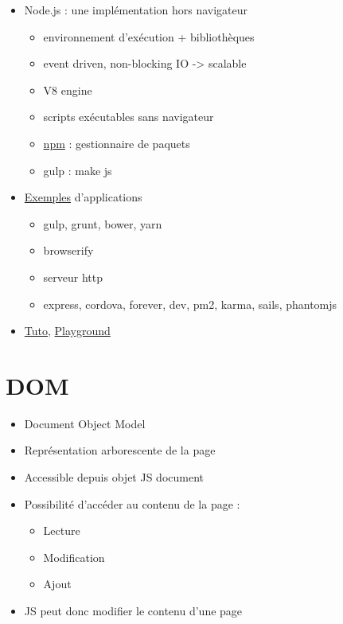 \begin{itemize}
\tightlist
\item
  Node.js : une implémentation hors navigateur

  \begin{itemize}
  \tightlist
  \item
    environnement d'exécution + bibliothèques
  \item
    event driven, non-blocking IO -\textgreater{} scalable
  \item
    V8 engine
  \item
    scripts exécutables sans navigateur
  \item
    \href{https://www.npmjs.com}{npm} : gestionnaire de paquets
  \item
    gulp : make js
  \end{itemize}
\item
  \href{https://colorlib.com/wp/npm-packages-node-js/}{Exemples}
  d'applications

  \begin{itemize}
  \tightlist
  \item
    gulp, grunt, bower, yarn
  \item
    browserify
  \item
    serveur http
  \item
    express, cordova, forever, dev, pm2, karma, sails, phantomjs
  \end{itemize}
\item
  \href{https://www.tutorialspoint.com/nodejs/index.htm}{Tuto},
  \href{https://runkit.com}{Playground}
\end{itemize}

\hypertarget{dom}{%
\section{DOM}\label{dom}}

\begin{itemize}
\tightlist
\item
  Document Object Model
\item
  Représentation arborescente de la page
\item
  Accessible depuis objet JS document
\item
  Possibilité d'accéder au contenu de la page :

  \begin{itemize}
  \tightlist
  \item
    Lecture
  \item
    Modification
  \item
    Ajout
  \end{itemize}
\item
  JS peut donc modifier le contenu d'une page
\end{itemize}

